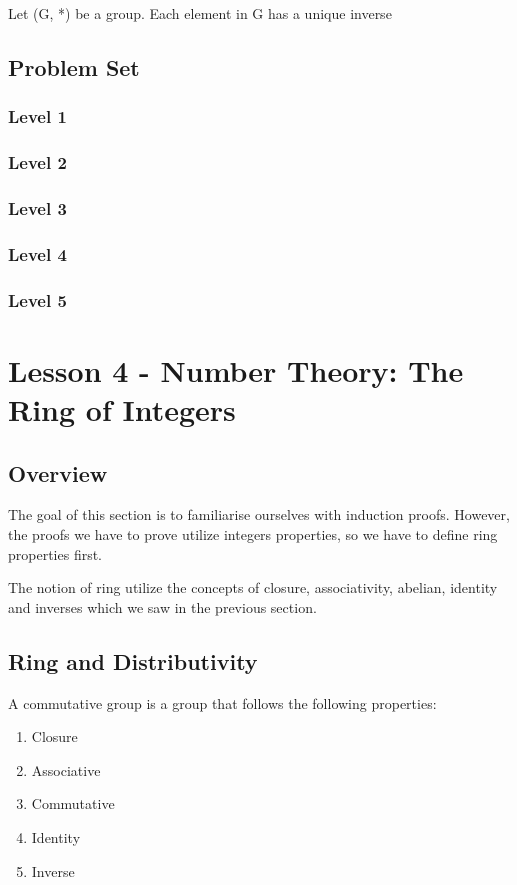 \documentclass{article}
\begin{document}
\begin{theorem}
    Let (G, *) be a group. Each element in G has a unique inverse
\end{theorem}

\subsection{Problem Set}
\subsubsection{Level 1}
\subsubsection{Level 2}
\subsubsection{Level 3}
\subsubsection{Level 4}
\subsubsection{Level 5}
\pagebreak

\section{Lesson 4 - Number Theory: The Ring of Integers}

\subsection{Overview}

The goal of this section is to familiarise ourselves with induction proofs. However,
the proofs we have to prove utilize integers properties, so we have to define
ring properties first.

The notion of ring utilize the concepts of closure, associativity, abelian,
identity and inverses which we saw in the previous section.

\subsection{Ring and Distributivity}

\begin{definition}
    A commutative group is a group that follows the following properties:
    \begin{enumerate}
	\item Closure
	\item Associative
	\item Commutative
	\item Identity
	\item Inverse
    \end{enumerate}
\end{definition}
\end{document}
